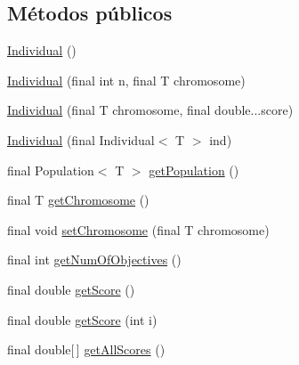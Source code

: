 \subsection*{Métodos públicos}
\begin{DoxyCompactItemize}
\item 
\hyperlink{classjenes_1_1population_1_1_individual_3_01_t_01extends_01_chromosome_01_4_aaef7161bf62cee0ac95f079394fdac9f}{Individual} ()
\item 
\hyperlink{classjenes_1_1population_1_1_individual_3_01_t_01extends_01_chromosome_01_4_ab976f777177706bca918974cc60728c9}{Individual} (final int n, final T chromosome)
\item 
\hyperlink{classjenes_1_1population_1_1_individual_3_01_t_01extends_01_chromosome_01_4_a0ee89d719da75153410f8757ebafdb0d}{Individual} (final T chromosome, final double...\-score)
\item 
\hyperlink{classjenes_1_1population_1_1_individual_3_01_t_01extends_01_chromosome_01_4_a39ca92146563b3b00576736296b523a5}{Individual} (final Individual$<$ T $>$ ind)
\item 
final Population$<$ T $>$ \hyperlink{classjenes_1_1population_1_1_individual_3_01_t_01extends_01_chromosome_01_4_a15020083468eb11265c621aca7de0bf2}{get\-Population} ()
\item 
final T \hyperlink{classjenes_1_1population_1_1_individual_3_01_t_01extends_01_chromosome_01_4_aeed25204463ec1e7eebe36674a24ada7}{get\-Chromosome} ()
\item 
final void \hyperlink{classjenes_1_1population_1_1_individual_3_01_t_01extends_01_chromosome_01_4_a14c0669f286f8097bb8fdf13dc5fcf50}{set\-Chromosome} (final T chromosome)
\item 
final int \hyperlink{classjenes_1_1population_1_1_individual_3_01_t_01extends_01_chromosome_01_4_a1c109dce60908107cc2dcfaf630b95f5}{get\-Num\-Of\-Objectives} ()
\item 
final double \hyperlink{classjenes_1_1population_1_1_individual_3_01_t_01extends_01_chromosome_01_4_aa95dc3489632913f59c9c9e5d30d89c0}{get\-Score} ()
\item 
final double \hyperlink{classjenes_1_1population_1_1_individual_3_01_t_01extends_01_chromosome_01_4_ad2cc30ec43ca42539e72c4619953fd3b}{get\-Score} (int i)
\item 
final double\mbox{[}$\,$\mbox{]} \hyperlink{classjenes_1_1population_1_1_individual_3_01_t_01extends_01_chromosome_01_4_ad3b9122edf5b711c5f6d860e0f7c36b2}{get\-All\-Scores} ()
\item 

\end{DoxyCompactItemize}
